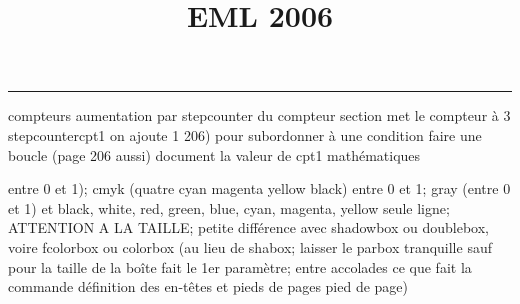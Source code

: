 \documentclass[11pt]{article}%
\title{\bf \vspace{-2cm} EML 2006} %
\author{} %
\date{} %
\renewcommand{\headrulewidth}{0pt}%
\renewcommand{\footrulewidth}{0.4pt}%
\begin{document}
\maketitle %
\vspace{-1.4cm}\hrule %
\thispagestyle{fancy}

\vspace*{.2cm}



compteurs%
aumentation par stepcounter du compteur section%
met le compteur à 3%
stepcounter{cpt1} on ajoute 1%
206) pour subordonner à une condition %
faire une boucle (page 206 aussi) %
document la valeur de cpt1 
mathématiques\newcommand{\ch}{\operatorname{ch}} 
\newcommand{\sh}{\operatorname{sh}}
\renewcommand{\tanh}{\operatorname{th}}
\renewcommand{\sinh}{\operatorname{sh}}
\renewcommand{\cosh}{\operatorname{ch}}
\newcommand{\argsh}{\operatorname{argsh}}
\newcommand{\argch}{\operatorname{argch}}
\newcommand{\argth}{\operatorname{argth}}
\newcommand{\ker}{\operatorname{Ker}}
\renewcommand{\im}{\operatorname{Im}}
\newcommand{\rg}{\operatorname{rg}}
\newcommand{\Id}{\operatorname{Id}}
\newcommand{\id}{\operatorname{id}}
\renewcommand{\leq}{\leq}
\renewcommand{\geq}{\geq }

entre 0 et 1); cmyk (quatre cyan magenta yellow black) entre 0 et 1;
gray (entre 0 et 1) et black, white, red, green, blue, cyan, magenta,
yellow%
seule ligne; ATTENTION A LA TAILLE; petite différence avec shadowbox ou
doublebox, voire fcolorbox ou colorbox (au lieu de shabox; laisser le
parbox tranquille sauf pour la taille de la boîte
\newcommand{\Tbox}[1]{\begin{center} \shabox{\parbox{0.6
\linewidth}{#1}} \end{center}} %
fait le 1er paramètre; entre accolades ce que fait la commande
définition des en-têtes et pieds de pages\pagestyle{fancy}
\chead{}
\rfoot[ \ \thepage]{\thepage}
\cfoot{}
\lfoot{}
\thispagestyle{fancy} %
pied de page)\renewcommand{\footrulewidth}{0.4pt}
\renewcommand{\headrulewidth}{0.4pt}
\end{document}
